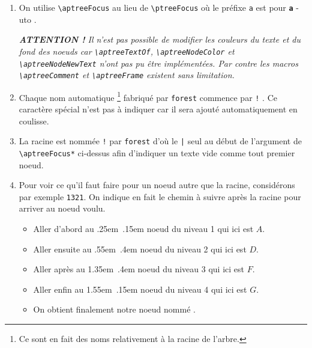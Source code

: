 \documentclass[12pt,a4paper]{article}
\theoremstyle{definition}
\newcommand\env[1]{\texttt{#1}}
\newcommand\macro[1]{\env{\textbackslash{}#1}}
\newcommand\whyprefix[2]{%
    \textbf{\prefix{#1}}-#2%
}
\newcommand\prefix[1]{%
    \texttt{#1}%
}
\begin{document}
\begin{enumerate}
	\item On utilise \macro{aptreeFocus} au lieu de \macro{ptreeFocus} où le préfixe \prefix{a} est pour \whyprefix{a}{uto}.

		  \medskip
		  
		  {\itshape
		  		\textbf{ATTENTION !}
		  		Il n'est pas possible de modifier les couleurs du texte et du fond des noeuds car \macro{aptreeTextOf}, \macro{aptreeNodeColor} et \macro{aptreeNodeNewText} n'ont pas pu être implémentées.
		  		Par contre les macros \macro{aptreeComment} et \macro{aptreeFrame} existent sans limitation.
		  }

		  \medskip

	\item Chaque nom automatique
	      \footnote{
	      		Ce sont en fait des noms relativement à la racine de l'arbre.
	      }
	      fabriqué par \verb#forest# commence par \texttt{!} . Ce caractère spécial n'est pas à indiquer car il sera ajouté automatiquement en coulisse.

	
	\item La racine est nommée \texttt{!} par \verb#forest# d'où le \verb#|# seul au début de l'argument de \macro{aptreeFocus*} ci-dessus afin d'indiquer un texte vide comme tout premier noeud.

	
	\item Pour voir ce qu'il faut faire pour un noeud autre que la racine, considérons par exemple \texttt{1321}. On indique en fait le chemin à suivre après la racine pour arriver au noeud voulu.
	\begin{itemize}
		\medskip
		
		\item Aller d'abord au
		      \kern.25em\,\ier{}
		      \kern.15em
		      noeud du niveau 1 qui ici est $A$.

		\item Aller ensuite au
		      \kern.55em\,\ieme{}
		      \kern.4em
		      noeud du niveau 2 qui ici est $D$.

		\item Aller après au
		      \kern1.35em\,\ieme{}
		      \kern.4em
		      noeud du niveau 3 qui ici est $F$.
		
		\item Aller enfin au
		      \kern1.55em\,\ier{}
		      \kern.15em
		      noeud du niveau 4 qui ici est $G$.
		      
		\medskip
		
		\item On obtient finalement notre noeud nommé .
	\end{itemize}
\end{enumerate}
\end{document}
